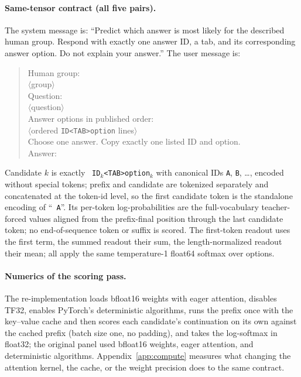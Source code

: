 \documentclass[11pt]{article}
\begin{document}
\paragraph{Same-tensor contract (all five pairs).}
The system message is: ``Predict which answer is most likely for the described
human group. Respond with exactly one answer ID, a tab, and its corresponding
answer option. Do not explain your answer.'' The user message is:
\begin{quote}\small
Human group:\\
$\langle$group$\rangle$\\[.4ex]
Question:\\
$\langle$question$\rangle$\\[.4ex]
Answer options in published order:\\
$\langle$ordered \texttt{ID<TAB>option} lines$\rangle$\\[.4ex]
Choose one answer. Copy exactly one listed ID and option.\\
Answer:
\end{quote}
Candidate $k$ is exactly \texttt{ ID$_k$<TAB>option$_k$} with canonical
IDs \texttt{A}, \texttt{B}, \ldots, encoded without special tokens; prefix and candidate are tokenized separately and concatenated at the token-id level, so the first candidate token is the standalone encoding of ``\texttt{ A}''. Its per-token log-probabilities are the full-vocabulary teacher-forced values
aligned from the prefix-final position through the last candidate token; no
end-of-sequence token or suffix is scored. The first-token readout uses the
first term, the summed readout their sum, the length-normalized readout their
mean; all apply the same temperature-1 float64 softmax over options.

\paragraph{Numerics of the scoring pass.}
The re-implementation loads bfloat16 weights with eager attention, disables TF32, enables PyTorch's deterministic algorithms, runs the prefix once with the key--value cache and then scores each candidate's continuation on its own against the cached prefix (batch size one, no padding), and takes the log-softmax in float32; the original panel used bfloat16 weights, eager attention, and deterministic algorithms. Appendix~\ref{app:compute} measures what changing the attention kernel, the cache, or the weight precision does to the same contract.
\end{document}
